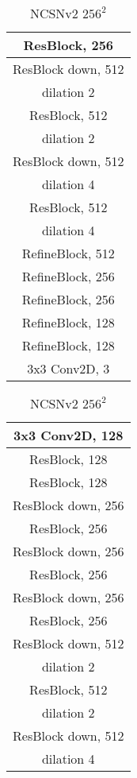 \documentclass{article}
\begin{document}
\begin{table}[H]
\begin{subtable}[t]{0.3\linewidth}
\begin{tabular}{c}
        \midrule
        ResBlock, 256\\
        \midrule
        ResBlock down, 512\\ dilation 2\\
        \midrule
        ResBlock, 512\\ dilation 2\\
        \midrule
        ResBlock down, 512 \\ dilation 4\\
        \midrule
        ResBlock, 512 \\ dilation 4\\
        \midrule
        RefineBlock, 512\\
        \midrule
        RefineBlock, 256\\
        \midrule
        RefineBlock, 256\\
        \midrule
        RefineBlock, 128\\
        \midrule
        RefineBlock, 128\\
        \midrule
        3x3 Conv2D, 3\\
        \bottomrule
        \end{tabular}
    \end{subtable}
    \hfill
    \begin{subtable}[t]{0.3\linewidth}
        \centering
        \caption{NCSNv2 $256^2$}
        \begin{tabular}{c}
        \toprule \toprule
        3x3 Conv2D, 128\\
        \midrule
        ResBlock, 128\\
        \midrule
        ResBlock, 128 \\
        \midrule
        ResBlock down, 256\\
        \midrule
        ResBlock, 256\\
        \midrule
        ResBlock down, 256\\
        \midrule
        ResBlock, 256\\
        \midrule
        ResBlock down, 256\\
        \midrule
        ResBlock, 256\\
        \midrule
        ResBlock down, 512\\ dilation 2\\
        \midrule
        ResBlock, 512\\ dilation 2\\
        \midrule
        ResBlock down, 512 \\ dilation 4\\

\end{tabular}
\end{subtable}
\end{table}
\end{document}
